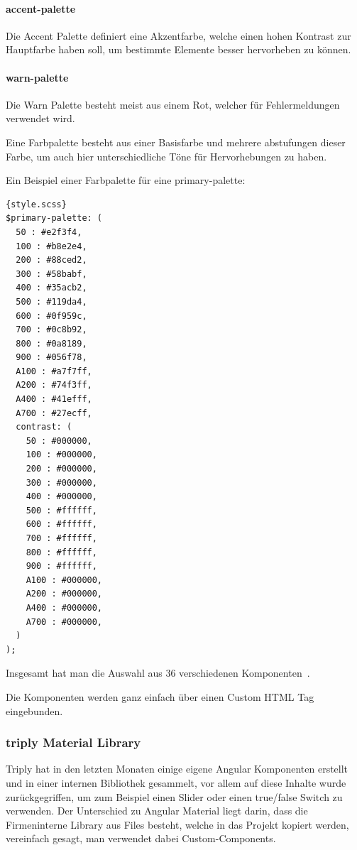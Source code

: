 \paragraph{accent-palette}
Die Accent Palette definiert eine Akzentfarbe, welche einen hohen Kontrast zur Hauptfarbe haben soll, um bestimmte Elemente
besser hervorheben zu können.

\paragraph{warn-palette}
Die Warn Palette besteht meist aus einem Rot, welcher für Fehlermeldungen verwendet wird.

\linebreak
\linebreak
\linebreak

Eine Farbpalette besteht aus einer Basisfarbe und mehrere abstufungen dieser Farbe, um auch hier unterschiedliche Töne für
Hervorhebungen zu haben.

Ein Beispiel einer Farbpalette für eine primary-palette:

\begin{lstlisting}[label={lst:custom-primary-color-palette}]{style.scss}
$primary-palette: (
  50 : #e2f3f4,
  100 : #b8e2e4,
  200 : #88ced2,
  300 : #58babf,
  400 : #35acb2,
  500 : #119da4,
  600 : #0f959c,
  700 : #0c8b92,
  800 : #0a8189,
  900 : #056f78,
  A100 : #a7f7ff,
  A200 : #74f3ff,
  A400 : #41efff,
  A700 : #27ecff,
  contrast: (
    50 : #000000,
    100 : #000000,
    200 : #000000,
    300 : #000000,
    400 : #000000,
    500 : #ffffff,
    600 : #ffffff,
    700 : #ffffff,
    800 : #ffffff,
    900 : #ffffff,
    A100 : #000000,
    A200 : #000000,
    A400 : #000000,
    A700 : #000000,
  )
);
\end{lstlisting}

Insgesamt hat man die Auswahl aus 36 verschiedenen Komponenten~\cite{angular-material-component-overview,angular-material-description,angular-material-with-angular}.

Die Komponenten werden ganz einfach über einen Custom HTML Tag eingebunden.

\subsubsection{triply Material Library}
Triply hat in den letzten Monaten einige eigene Angular Komponenten erstellt und in einer internen Bibliothek
gesammelt, vor allem auf diese Inhalte wurde zurückgegriffen, um zum Beispiel einen Slider oder einen true/false Switch
zu verwenden.
Der Unterschied zu Angular Material liegt darin, dass die Firmeninterne Library aus Files besteht, welche in das Projekt
kopiert werden, vereinfach gesagt, man verwendet dabei Custom-Components.

